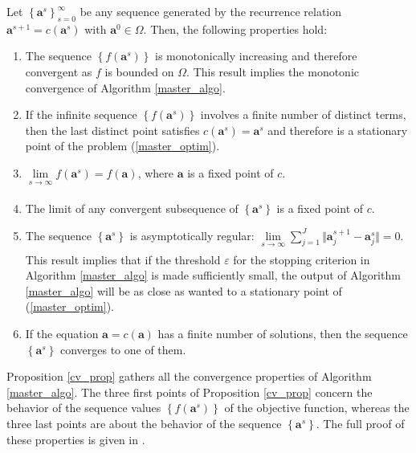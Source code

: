 \documentclass[
]{jss}
\begin{document}
\begin{proposition}
    Let $\left\lbrace  \mathbf a^s\right\rbrace_{s=0}^{\infty}$ be any sequence generated by the recurrence relation $\mathbf a^{s+1} = c( \mathbf a^s)$ with $\mathbf a^0\in\Omega$. Then, the following properties hold:
    \begin{enumerate}[topsep=0pt,itemsep=-0.75ex,partopsep=1ex,parsep=1ex, label = {(\alph*)}]
        \item  \label{prop_pt1} The sequence $\left\lbrace f( \mathbf a^s)\right\rbrace $ is monotonically increasing and therefore convergent as $f$ is bounded on $\Omega$. This result implies the monotonic convergence of Algorithm \ref{master_algo}.
        \item  \label{prop_pt2} If the infinite sequence $\left\lbrace f( \mathbf a^s)\right\rbrace $ involves a finite number of distinct terms, then the last distinct point satisfies $c( \mathbf a^s) =  \mathbf a^s$ and therefore is a stationary point of the problem (\ref{master_optim}). 
    \item  \label{prop_pt3} $\underset{s\xrightarrow[]{}\infty}\lim{f( \mathbf a^s) = f( \mathbf a)}$, where $\mathbf a$ is a fixed point of $c$.
        \item  \label{prop_pt4} The limit of any convergent subsequence of $\left\lbrace  \mathbf a^s\right\rbrace $ is a fixed point of $c$.
        \item  \label{prop_pt5} The sequence $\left\lbrace  \mathbf a^s \right\rbrace $ is asymptotically regular: $\underset{s\xrightarrow[]{}\infty}\lim{\sum_{j=1}^{J} \Vert  \mathbf a_j^{s+1} -  \mathbf a_j^s \Vert} = 0$. This result implies that if the threshold $\varepsilon$ for the stopping criterion in Algorithm \ref{master_algo} is made sufficiently small, the output of Algorithm \ref{master_algo} will be as close as wanted to a stationary point of (\ref{master_optim}). 
        \item  \label{prop_pt6} If the equation $\mathbf a = c( \mathbf a)$ has a finite number of solutions, then the sequence $\left\lbrace  \mathbf a^s\right\rbrace $ converges to one of them.
    \end{enumerate}
    \label{cv_prop}
\end{proposition}

Proposition \ref{cv_prop} gathers all the convergence properties of
Algorithm \ref{master_algo}. The three first points of Proposition
\ref{cv_prop} concern the behavior of the sequence values
\(\left\lbrace f( \mathbf a^s) \right\rbrace\) of the objective
function, whereas the three last points are about the behavior of the
sequence \(\left\lbrace \mathbf a^s \right\rbrace\). The full proof of
these properties is given in \cite{Tenenhaus2017}.
\end{document}
